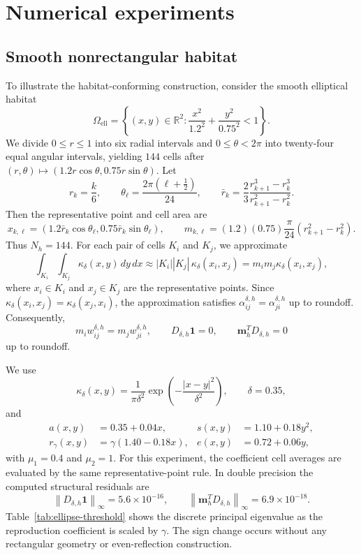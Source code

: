 \documentclass[11pt]{article}
\theoremstyle{definition}
\newcommand{\R}{\mathbb{R}}
\newcommand{\norm}[1]{\left\lVert #1\right\rVert}
\newcommand{\one}{\mathbf{1}}
\begin{document}
\section{Numerical experiments}
\label{sec:numerics}

\subsection{Smooth nonrectangular habitat}

To illustrate the habitat-conforming construction, consider the smooth elliptical habitat
\[
 \Omega_{\mathrm{ell}}
 =
 \left\{(x,y)\in\R^2:
 \frac{x^2}{1.2^2}+\frac{y^2}{0.75^2}<1\right\}.
\]
We divide $0\le r\le1$ into six radial intervals and $0\le\theta<2\pi$ into twenty-four equal angular intervals, yielding $144$ cells after $(r,\theta)\mapsto(1.2r\cos\theta,0.75r\sin\theta)$.  Let
\[
 r_k=\frac{k}{6},\qquad \theta_\ell=\frac{2\pi(\ell+\tfrac12)}{24},\qquad
 \bar r_k=\frac{2}{3}\frac{r_{k+1}^3-r_k^3}{r_{k+1}^2-r_k^2}.
\]
Then the representative point and cell area are
\[
 x_{k,\ell}=(1.2\bar r_k\cos\theta_\ell,0.75\bar r_k\sin\theta_\ell),
 \qquad
 m_{k,\ell}=(1.2)(0.75)\frac{\pi}{24}(r_{k+1}^2-r_k^2).
\]
Thus $N_h=144$.  For each pair of cells $K_i$ and $K_j$, we approximate
\[
 \int_{K_i}\int_{K_j}\kappa_\delta(x,y)\,dy\,dx
 \approx
 |K_i||K_j|\,\kappa_\delta(x_i,x_j)
 =
 m_im_j\kappa_\delta(x_i,x_j),
\]
where $x_i\in K_i$ and $x_j\in K_j$ are the representative points.  Since $\kappa_\delta(x_i,x_j)=\kappa_\delta(x_j,x_i)$, the approximation satisfies $\alpha_{ij}^{\delta,h}=\alpha_{ji}^{\delta,h}$ up to roundoff.  Consequently,
\[
 m_iw_{ij}^{\delta,h}=m_jw_{ji}^{\delta,h},
 \qquad
 D_{\delta,h}\one=0,
 \qquad
 \mathbf m_h^TD_{\delta,h}=0
\]
up to roundoff.

We use
\[
 \kappa_\delta(x,y)
 =
 \frac1{\pi\delta^2}
 \exp\!\left(-\frac{|x-y|^2}{\delta^2}\right),
 \qquad
 \delta=0.35,
\]
and
\[
\begin{aligned}
 a(x,y)&=0.35+0.04x,
 &s(x,y)&=1.10+0.18y^2,\\
 r_\gamma(x,y)&=\gamma(1.40-0.18x),
 &e(x,y)&=0.72+0.06y,
\end{aligned}
\]
with $\mu_1=0.4$ and $\mu_2=1$.  For this experiment, the coefficient cell averages are evaluated by the same representative-point rule.  In double precision the computed structural residuals are
\[
 \norm{D_{\delta,h}\one}_\infty
 =5.6\times10^{-16},
 \qquad
 \norm{\mathbf m_h^TD_{\delta,h}}_\infty
 =6.9\times10^{-18}.
\]
Table~\ref{tab:ellipse-threshold} shows the discrete principal eigenvalue as the reproduction coefficient is scaled by $\gamma$.  The sign change occurs without any rectangular geometry or even-reflection construction.
\end{document}
